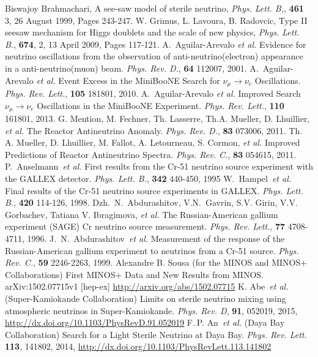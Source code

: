 \documentclass[aps,prd,twocolumn,nofootinbib]{revtex4-1}
\begin{document}
\begin{thebibliography}{9}
Biswajoy Brahmachari, A see-saw model of sterile neutrino, \emph{Phys. Lett. B,}, {\bf 461} 3, 26 August 1999, Pages 243-247.
W. Grimus, L. Lavoura, B. Radovcic, Type II seesaw mechanism for Higgs doublets and the scale of new physics, \emph{Phys. Lett. B.}, {\bf 674}, 2, 13 April 2009, Pages 117-121.
  A.~Aguilar-Arevalo \emph{et al.} Evidence for neutrino oscillations from the observation of anti-neutrino(electron) appearance in a anti-neutrino(muon) beam. \emph{Phys. Rev. D.}, {\bf 64} 112007, 2001.
  A.~Aguilar-Arevalo \emph{et al.} Event Excess in the MiniBooNE Search for $\nu_\mu \rightarrow \nu_e$ Oscillations. \emph{Phys. Rev. Lett.}, {\bf 105} 181801, 2010.
  A.~Aguilar-Arevalo \emph{et al.} Improved Search $\nu_\mu \rightarrow \nu_e$ Oscillations in the MiniBooNE Experiment. \emph{Phys. Rev. Lett.}, {\bf 110} 161801, 2013.
  G. Mention, M. Fechner, Th. Lasserre, Th.A. Mueller, D. Lhuillier, \emph{et al.} The Reactor Antineutrino Anomaly. \emph{Phys. Rev. D.}, {\bf 83} 073006, 2011.
  Th. A. Mueller, D. Lhuillier, M. Fallot, A. Letourneau, S. Cormon, \emph{et al.} Improved Predictions of Reactor Antineutrino Spectra. \emph{Phys. Rev. C.}, {\bf 83} 054615, 2011.
  P.~Anselmann~\emph{et al.} First results from the Cr-51 neutrino source experiment with the GALLEX detector. \emph{Phys. Lett. B.}, {\bf 342} 440-450, 1995
  W.~Hampel~\emph{et al.} Final results of the Cr-51 neutrino source experiments in GALLEX. \emph{Phys. Lett. B.}, {\bf 420} 114-126, 1998.
  Dzh.~N.~Abdurashitov, V.N.~Gavrin, S.V. Girin, V.V. Gorbachev, Tatiana V. Ibragimova, \emph{et al.} The Russian-American gallium experiment (SAGE) Cr neutrino source measurement. \emph{Phys. Rev. Lett.}, {\bf 77} 4708-4711, 1996.
  J.~N.~Abdurashitov~\emph{et al.} Measurement of the response of the Russian-American gallium experiment to neutrinos from a Cr-51 source. \emph{Phys. Rev. C.}, {\bf 59} 2246-2263, 1999.
  Alexandre B. Sousa (for the MINOS and MINOS+ Collaborations) First MINOS+ Data and New Results from MINOS. arXiv:1502.07715v1 [hep-ex] \url{http://arxiv.org/abs/1502.07715}
  K. Abe~\emph{et al.} (Super-Kamiokande Collaboration) Limits on sterile neutrino mixing using atmospheric neutrinos in Super-Kamiokande. \emph{Phys. Rev. D}, {\bf 91}, 052019, 2015, \url{http://dx.doi.org/10.1103/PhysRevD.91.052019}
  F. P. An~\emph{et al.} (Daya Bay Collaboration) Search for a Light Sterile Neutrino at Daya Bay. \emph{Phys. Rev. Lett.} {\bf 113}, 141802, 2014, \url{http://dx.doi.org/10.1103/PhysRevLett.113.141802}

\end{thebibliography}
\end{document}
